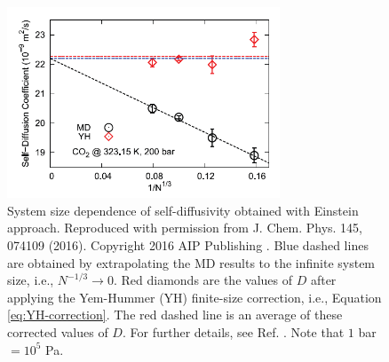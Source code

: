 \documentclass[9pt,bestpractices]{livecoms}
\begin{document}
\begin{figure}[htb!]
	\centering
	\includegraphics[width=3.2in]{MoultosFig1.png}
	\caption{System size dependence of self-diffusivity obtained with Einstein approach. Reproduced with permission from J. Chem. Phys. 145, 074109 (2016). Copyright 2016 AIP Publishing \cite{Moultos2016}. Blue dashed lines are obtained by extrapolating the MD results to the infinite system size, i.e., $N^{-1/3} \to 0$. Red diamonds are the values of $D$ after applying the Yem-Hummer (YH) finite-size correction, i.e., Equation \ref{eq:YH-correction}. The red dashed line is an average of these corrected values of $D$. For further details, see Ref. \cite{Moultos2016}. Note that $1$ bar $ = 10^5$ Pa.}
	\label{fig:MoultosFig1}
\end{figure}



%
\end{document}

